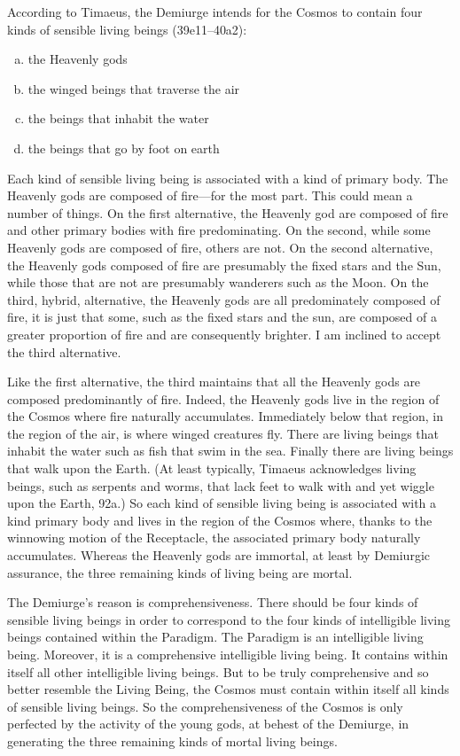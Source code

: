 According to Timaeus, the Demiurge intends for the Cosmos to contain four kinds of sensible living beings (39e11--40a2):
\begin{enumerate}[(a)]
	\item the Heavenly gods
	\item the winged beings that traverse the air
	\item the beings that inhabit the water
	\item the beings that go by foot on earth
\end{enumerate}
Each kind of sensible living being is associated with a kind of primary body. The Heavenly gods are composed of fire---for the most part. This could mean a number of things. On the first alternative, the Heavenly god are composed of fire and other primary bodies with fire predominating. On the second, while some Heavenly gods are composed of fire, others are not. On the second alternative, the Heavenly gods composed of fire are presumably the fixed stars and the Sun, while those that are not are presumably wanderers such as the Moon. On the third, hybrid, alternative, the Heavenly gods are all predominately composed of fire, it is just that some, such as the fixed stars and the sun, are composed of a greater proportion of fire and are consequently brighter. I am inclined to accept the third alternative. 

Like the first alternative, the third maintains that all the Heavenly gods are composed predominantly of fire. Indeed, the Heavenly gods live in the region of the Cosmos where fire naturally accumulates. Immediately below that region, in the region of the air, is where winged creatures fly. There are living beings that inhabit the water such as fish that swim in the sea. Finally there are living beings that walk upon the Earth. (At least typically, Timaeus acknowledges living beings, such as serpents and worms, that lack feet to walk with and yet wiggle upon the Earth, 92a.) So each kind of sensible living being is associated with a kind primary body and lives in the region of the Cosmos where, thanks to the winnowing motion of the Receptacle, the associated primary body naturally accumulates. Whereas the Heavenly gods are immortal, at least by Demiurgic assurance, the three remaining kinds of living being are mortal.

The Demiurge's reason is comprehensiveness. There should be four kinds of sensible living beings in order to correspond to the four kinds of intelligible living beings contained within the Paradigm. The Paradigm is an intelligible living being. Moreover, it is a comprehensive intelligible living being. It contains within itself all other intelligible living beings. But to be truly comprehensive and so better resemble the Living Being, the Cosmos must contain within itself all kinds of sensible living beings. So the comprehensiveness of the Cosmos is only perfected by the activity of the young gods, at behest of the Demiurge, in generating the three remaining kinds of mortal living beings.

